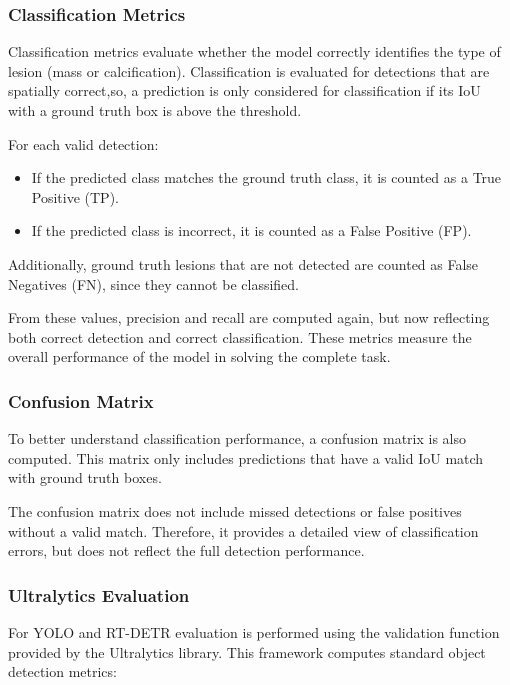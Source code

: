 \documentclass[12pt,a4paper]{article} %
\begin{document}
\subsubsection{Classification Metrics}

Classification metrics evaluate whether the model correctly identifies the type of lesion (mass or calcification). Classification is evaluated for detections that are spatially correct,so, a prediction is only considered for classification if its IoU with a ground truth box is above the threshold.

For each valid detection:

\begin{itemize}
    \item If the predicted class matches the ground truth class, it is counted as a True Positive (TP).
    \item If the predicted class is incorrect, it is counted as a False Positive (FP).
\end{itemize}

Additionally, ground truth lesions that are not detected are counted as False Negatives (FN), since they cannot be classified.

From these values, precision and recall are computed again, but now reflecting both correct detection and correct classification. These metrics measure the overall performance of the model in solving the complete task.

\subsubsection{Confusion Matrix}

To better understand classification performance, a confusion matrix is also computed. This matrix only includes predictions that have a valid IoU match with ground truth boxes.

The confusion matrix does not include missed detections or false positives without a valid match. Therefore, it provides a detailed view of classification errors, but does not reflect the full detection performance.

\subsubsection{Ultralytics Evaluation}

For YOLO and RT-DETR evaluation is performed using the validation function provided by the Ultralytics library. This framework computes standard object detection metrics:
\end{document}
